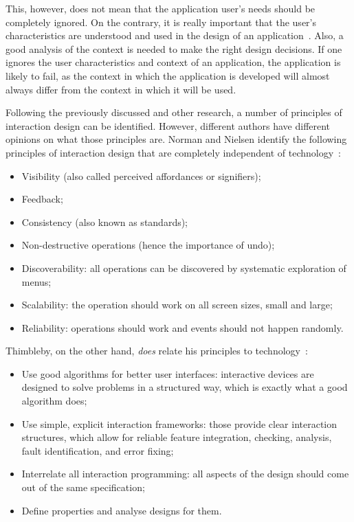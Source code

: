 This, however, does not mean that the application user's needs should be completely ignored. On the contrary, it is really important that the user's characteristics are understood and used in the design of an application~\cite{badre2002shaping}. Also, a good analysis of the context is needed to make the right design decisions. If one ignores the user characteristics and context of an application, the application is  likely to fail, as the context in which the application is developed will almost always differ from the context in which it will be used.

Following the previously discussed and other research, a number of principles of interaction design can be identified. However, different authors have different opinions on what those principles are. Norman and Nielsen identify the following principles of interaction design that are completely independent of technology~\cite{norman2010gestural}:
\begin{itemize}[noitemsep,topsep=0pt,parsep=0pt,partopsep=0pt]
\item Visibility (also called perceived affordances or signifiers);
\item Feedback;
\item Consistency (also known as standards);
\item Non-destructive operations (hence the importance of undo);
\item Discoverability: all operations can be discovered by systematic exploration of menus;
\item Scalability: the operation should work on all screen sizes, small and large;
\item Reliability: operations should work and events should not happen randomly.
\end{itemize}
Thimbleby, on the other hand, \emph{does} relate his principles to technology~\cite{thimbleby2007press}:
\begin{itemize}[noitemsep,topsep=0pt,parsep=0pt,partopsep=0pt]
\item Use good algorithms for better user interfaces: interactive devices are designed to solve problems in a structured way, which is exactly what a good algorithm does;
\item Use simple, explicit interaction frameworks: those provide clear interaction structures, which allow for reliable feature integration, checking, analysis, fault identification, and error fixing;
\item Interrelate all interaction programming: all aspects of the design should come out of the same specification;
\item Define properties and analyse designs for them.
\end{itemize}
